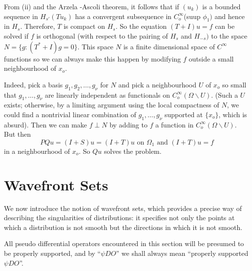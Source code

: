 From (ii) and the Arzela -Ascoli theorem, it follows that if $(u_k)$
is a bounded sequence in $H_{s'} (Tu_k)$ has a convergent subsequence in
$C^{\infty}_o$(suup $\phi_1)$ and hence in $H_s$. Therefore, $T$ is
compact on $H_s$. So the equation $(T + I)u = f$ can be solved if $f$
is orthogonal (with respect to the pairing of $H_s$ and $H_{-s})$ to
the space $N = \{ g : ( T^* + I) g = 0 \}$. This space $N$  is a
finite dimensional space of $C^{\infty}$ functions so we can always
make this happen by modifying $f$ outside a small neighbourhood of
$x_o$. 

Indeed, pick a basis $g_1,g_2,  \ldots,  g_{\nu}$ for $N$ and pick a
neighbourhood $U$  of $x_o$ so small that $g_1, \ldots,  g_{\nu}$ are
linearly independent as functionals on $C^{\infty}_o (\Omega
\backslash U)$. (Such a $U$ exists; otherwise,  by a limiting argument
using the local compactness of $N$, we could find a nontrivial linear
combination of $g_1, \ldots,  g_{\nu}$ supported at $\{ x_o \}$, which
is absurd). Then we can make $f \perp N$ by adding to $f$ a function
in $C^{\infty}_o (\Omega \backslash U)$. But then  
$$
PQu = (I +S) u = (I +T) u \text{ on } \Omega_1 \text{ and } (I +T)u =f
$$\pageoriginale
in a neighbourhood of $x_o$. So $Qu$ solves the problem.

\section{Wavefront Sets}\label{chap4:sec9}%

We now introduce the notion of wavefront sets, which provides a
precise way of describing the singularities of distributions: it
specifies not only the points at which a distribution is not smooth
but the directions in which it is not smooth. 

All pseudo differential operators encountered in this section will be
presumed to be properly supported,  and by ``$\psi D O$'' we shall
always mean ``properly supported $\psi D O$''. 

